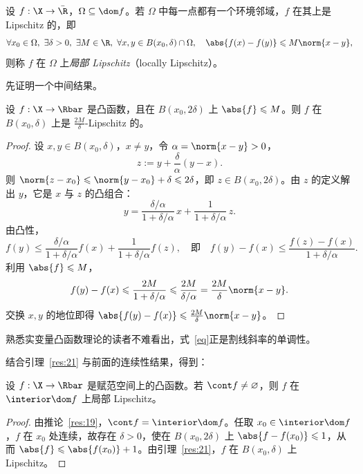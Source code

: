 \begin{definition}[局部 Lipschitz]
\label{def:14}
设 $f:\X\to\bar{\R}$，$\Omega\subseteq\dom f$。若 $\Omega$ 中每一点都有一个环境邻域，$f$ 在其上是 Lipschitz 的，即
\[
  \forall x_0\in\Omega,\ \exists\delta>0,\ \exists M\in\R,\ \forall x,y\in B(x_0,\delta)\cap\Omega,\quad \abs{f(x)-f(y)}\leqslant M\norm{x-y},
\]
则称 $f$ 在 $\Omega$ 上\emph{局部 Lipschitz}（locally Lipschitz）。
\end{definition}

先证明一个中间结果。

\begin{lemma}
\label{res:21}
设 $f:\X\to\Rbar$ 是凸函数，且在 $B(x_0,2\delta)$ 上 $\abs{f}\leqslant M$。则 $f$ 在 $B(x_0,\delta)$ 上是 $\frac{2M}{\delta}$-Lipschitz 的。
\end{lemma}

\begin{proof}
设 $x,y\in B(x_0,\delta)$，$x\neq y$，令 $\alpha=\norm{x-y}>0$，
\[
  z:=y+\frac{\delta}{\alpha}(y-x).
\]
则 $\norm{z-x_0}\leqslant\norm{y-x_0}+\delta\leqslant2\delta$，即 $z\in B(x_0,2\delta)$。由 $z$ 的定义解出 $y$，它是 $x$ 与 $z$ 的凸组合：
\[
  y=\frac{\delta/\alpha}{1+\delta/\alpha}\,x+\frac{1}{1+\delta/\alpha}\,z .
\]
由凸性，
\begin{equation}
  \label{eq}
  f(y)\leqslant\frac{\delta/\alpha}{1+\delta/\alpha}f(x)+\frac{1}{1+\delta/\alpha}f(z),
  \quad\text{即}\quad
  f(y)-f(x)\leqslant\frac{f(z)-f(x)}{1+\delta/\alpha}.
\end{equation}
利用 $\abs{f}\leqslant M$，
\[
  f(y)-f(x)\leqslant\frac{2M}{1+\delta/\alpha}\leqslant\frac{2M}{\delta/\alpha}=\frac{2M}{\delta}\norm{x-y}.
\]
交换 $x,y$ 的地位即得 $\abs{f(y)-f(x)}\leqslant\frac{2M}{\delta}\norm{x-y}$。
\end{proof}

\begin{remark}
  熟悉实变量凸函数理论的读者不难看出，式~\ref{eq}正是割线斜率的单调性。
\end{remark}

结合引理~\ref{res:21} 与前面的连续性结果，得到：

\begin{proposition}
\label{res:22}
设 $f:\X\to\Rbar$ 是赋范空间上的凸函数。若 $\cont f\neq\varnothing$，则 $f$ 在 $\interior\dom f$ 上局部 Lipschitz。
\end{proposition}

\begin{proof}
由推论~\ref{res:19}，$\cont f=\interior\dom f$。任取 $x_0\in\interior\dom f$，$f$ 在 $x_0$ 处连续，故存在 $\delta>0$，使在 $B(x_0,2\delta)$ 上 $\abs{f-f(x_0)}\leqslant1$，从而 $\abs{f}\leqslant\abs{f(x_0)}+1$。由引理~\ref{res:21}，$f$ 在 $B(x_0,\delta)$ 上 Lipschitz。
\end{proof}

